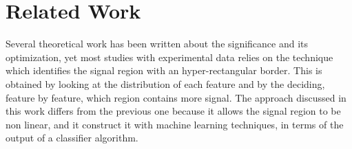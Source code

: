 \documentclass{article}
\begin{document}

\section{Related Work}
\label{sec:rw}

Several theoretical work has been written about the significance and its optimization, yet most studies with experimental data relies on the technique which identifies the signal region with an hyper-rectangular border. This is obtained by looking at the distribution of each feature and by the deciding, feature by feature, which region contains more signal. 
The approach discussed in this work differs from the previous one because it allows the signal region to be non linear, and it construct it with machine learning techniques, in terms of the output of a classifier algorithm.
\end{document}
